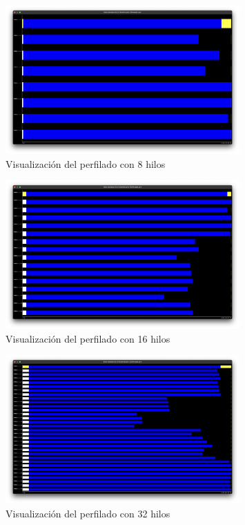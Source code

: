\documentclass[a4paper, 10pt, onecolumn]{IEEEtran}
\begin{document}
\begin{figure}[H]
  \centering
  \includegraphics[width=0.8\textwidth]{./img/paraver-8threads.png}
  \caption{Visualización del perfilado con 8 hilos}
  \label{fig:paraver_8threads}
\end{figure}

\begin{figure}[H]
  \centering
  \includegraphics[width=0.8\textwidth]{./img/paraver-16threads.png}
  \caption{Visualización del perfilado con 16 hilos}
  \label{fig:paraver_16threads}
\end{figure}

\begin{figure}[H]
  \centering
  \includegraphics[width=0.8\textwidth]{./img/paraver-32threads.png}
  \caption{Visualización del perfilado con 32 hilos}
  \label{fig:paraver_32threads}
\end{figure}
\end{document}
